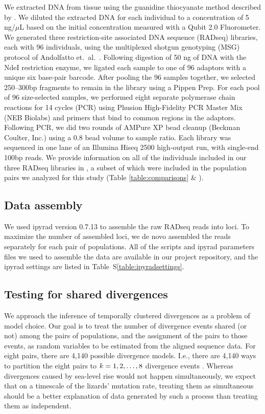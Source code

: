 We extracted DNA from tissue using the guanidine thiocyanate method described
by \citet{Esselstyn2008}.
We diluted the extracted DNA for each individual to a concentration of 5
ng/$\mu$L based on the initial concentration measured with a Qubit 2.0
Fluorometer.
We generated three restriction-site associated DNA sequence (RADseq) libraries,
each with 96 individuals, using the multiplexed shotgun genotyping (MSG)
protocol of Andolfatto et.\ al.\ \citep{Andolfatto2011}.
Following digestion of 50 ng of DNA with the NdeI restriction enzyme, we
ligated each sample to one of 96 adaptors with a unique six base-pair barcode.
After pooling the 96 samples together, we selected 250--300bp fragments to
remain in the library using a Pippen Prep.
For each pool of 96 size-selected samples, we performed eight separate
polymerase chain reactions for 14 cycles (PCR) using Phusion High-Fidelity PCR
Master Mix (NEB Biolabs) and primers that bind to common regions in the
adaptors.
Following PCR, we did two rounds of AMPure XP bead cleanup (Beckman Coulter,
Inc.) using a 0.8 bead volume to sample ratio.
Each library was sequenced in one lane of an Illumina Hiseq 2500 high-output
run, with single-end 100bp reads.
We provide information on all of the individuals included in our three RADseq
libraries in , a subset of which were included in the
population pairs we analyzed for this study (Table \ref{table:comparisons} \&
).

\subsection{Data assembly}
We used ipyrad version 0.7.13 \citep{ipyrad0713} to assemble the raw RADseq
reads into loci.
To maximize the number of assembled loci, we de novo assembled the reads
separately for each pair of populations.
All of the scripts and ipyrad parameters files we used to assemble the data are available
in our project repository, and the ipyrad settings are listed in
Table~S\ref{table:ipyradsettings}.

\subsection{Testing for shared divergences}
We approach the inference of temporally clustered divergences as a problem of
model choice.
Our goal is to treat the number of divergence events shared (or not) among the
pairs of populations, and the assignment of the pairs to those events, as
random variables to be estimated from the aligned sequence data.
For eight pairs, there are 4,140 possible divergence models.
I.e., there are 4,140 ways to partition the eight pairs to $k_{} = 1, 2,
\ldots, 8$ divergence events \citep{Bell1934,Oaks2014dpp,Oaks2018ecoevolity}.
Whereas divergences caused by sea-level rise would not happen simultaneously,
we expect that on a timescale of the lizards' mutation rate, treating them as
simultaneous should be a better explanation of data generated by such a
process than treating them as independent.


